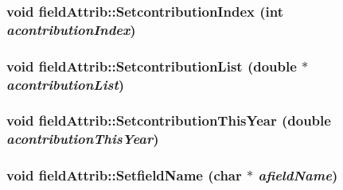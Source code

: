 \label{classfield_attrib_a2e9eb533967cb731f5617795916beece}
\hypertarget{classfield_attrib_a45ae6386d6b50b150c4f362780f697d8}{
\subsubsection[{SetcontributionIndex}]{\setlength{\rightskip}{0pt plus 5cm}void fieldAttrib::SetcontributionIndex (int {\em acontributionIndex})}}
\label{classfield_attrib_a45ae6386d6b50b150c4f362780f697d8}
\hypertarget{classfield_attrib_ae5184861296fd63af3c2b1a9403537d8}{
\subsubsection[{SetcontributionList}]{\setlength{\rightskip}{0pt plus 5cm}void fieldAttrib::SetcontributionList (double $\ast$ {\em acontributionList})}}
\label{classfield_attrib_ae5184861296fd63af3c2b1a9403537d8}
\hypertarget{classfield_attrib_abd3790fd21092aa352faa41a5d055954}{
\subsubsection[{SetcontributionThisYear}]{\setlength{\rightskip}{0pt plus 5cm}void fieldAttrib::SetcontributionThisYear (double {\em acontributionThisYear})}}
\label{classfield_attrib_abd3790fd21092aa352faa41a5d055954}
\hypertarget{classfield_attrib_a9926dbe834aa92abb307e7e749fcba26}{
\subsubsection[{SetfieldName}]{\setlength{\rightskip}{0pt plus 5cm}void fieldAttrib::SetfieldName (char $\ast$ {\em afieldName})}}
